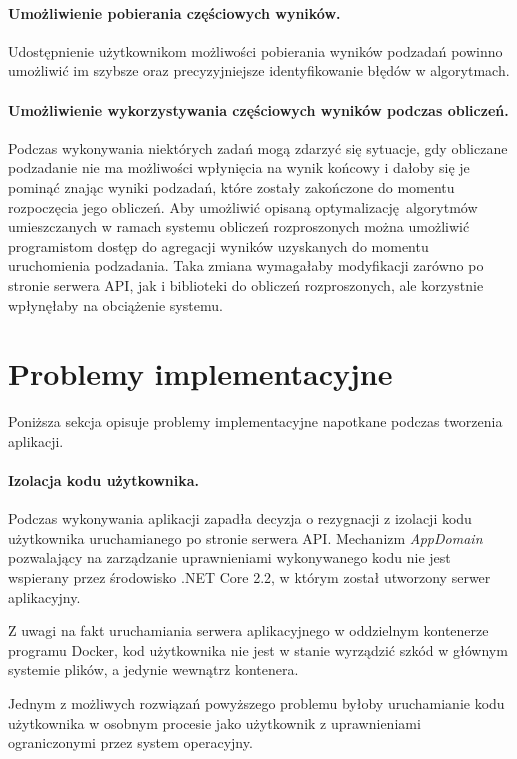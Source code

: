 \documentclass[a4paper,11pt,twoside]{report}
\theoremstyle{definition}
\begin{document}
        \paragraph{Umożliwienie pobierania częściowych wyników.}
        Udostępnienie użytkownikom możliwości pobierania wyników podzadań powinno umożliwić im szybsze oraz precyzyjniejsze identyfikowanie błędów w algorytmach.

        \paragraph{Umożliwienie wykorzystywania częściowych wyników podczas obliczeń.}
        Podczas wykonywania niektórych zadań mogą zdarzyć się sytuacje, gdy obliczane podzadanie nie ma możliwości wpłynięcia na wynik końcowy i dałoby się je pominąć znając wyniki podzadań, które zostały zakończone do momentu rozpoczęcia jego obliczeń.
        Aby umożliwić opisaną optymalizację algorytmów umieszczanych w ramach systemu obliczeń rozproszonych można umożliwić programistom dostęp do agregacji wyników uzyskanych do momentu uruchomienia podzadania.
        Taka zmiana wymagałaby modyfikacji zarówno po stronie serwera API, jak i biblioteki do obliczeń rozproszonych, ale korzystnie wpłynęłaby na obciążenie systemu.
        
    \section{Problemy implementacyjne}
        Poniższa sekcja opisuje problemy implementacyjne napotkane podczas tworzenia aplikacji.
        
        \paragraph{Izolacja kodu użytkownika.}
            Podczas wykonywania aplikacji zapadła decyzja o rezygnacji z izolacji kodu użytkownika uruchamianego po stronie serwera API. Mechanizm \textit{AppDomain} pozwalający na zarządzanie uprawnieniami wykonywanego kodu nie jest wspierany przez środowisko .NET Core 2.2, w którym został utworzony serwer aplikacyjny. 
            
            Z uwagi na fakt uruchamiania serwera aplikacyjnego w oddzielnym kontenerze programu Docker, kod użytkownika nie jest w stanie wyrządzić szkód w głównym systemie plików, a jedynie wewnątrz kontenera.
            
            Jednym z możliwych rozwiązań powyższego problemu byłoby uruchamianie kodu użytkownika w osobnym procesie jako użytkownik z uprawnieniami ograniczonymi przez system operacyjny.
            
\end{document}
